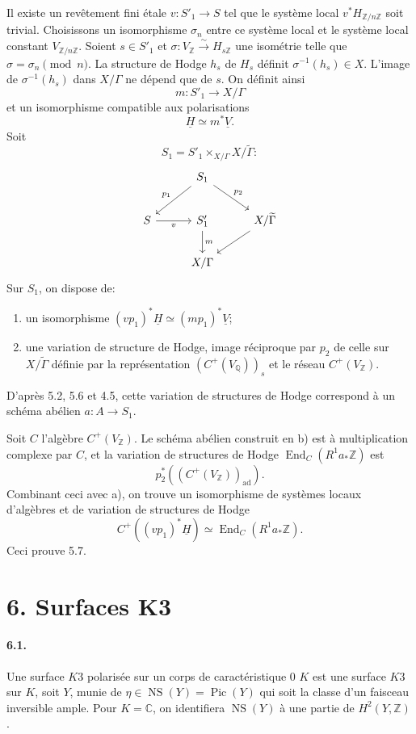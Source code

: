 \documentclass[10pt]{article}
\newcommand{\C}{\mathbb{C}}
\newcommand{\Q}{\mathbb{Q}}
\newcommand{\Z}{\mathbb{Z}}
\newcommand{\Pic}{\operatorname{Pic}}
\newcommand{\End}{\operatorname{End}}
\newcommand{\iso}{\xrightarrow{\sim}}
\providecommand{\NS}{\operatorname{NS}}
\begin{document}
Il existe un revêtement fini étale $v:S'_1\to S$ tel que le système local $v^*H_{\Z/n\Z}$ soit trivial. Choisissons un isomorphisme $\sigma_n$ entre ce système local et le système local constant $V_{\Z/n\Z}$. Soient $s\in S'_1$ et $\sigma:V_\Z\iso H_{s\Z}$ une isométrie telle que $\sigma=\sigma_n\pmod n$. La structure de Hodge $h_s$ de $H_s$ définit $\sigma^{-1}(h_s)\in X$. L'image de $\sigma^{-1}(h_s)$ dans $X/\Gamma$ ne dépend que de $s$. On définit ainsi
\[
m:S'_1\longrightarrow X/\Gamma
\]
et un isomorphisme compatible aux polarisations
\[
\underline H\simeq m^*\underline V.
\]
Soit
\[
S_1=S'_1\times_{X/\Gamma}X/\widetilde\Gamma:
\]
\[
\begin{tikzcd}[column sep=2.7em,row sep=2.0em]
& S_1 \arrow[dl,"p_1"'] \arrow[dr,"p_2"] &\\
S \arrow[r,"v"'] & S'_1 \arrow[d,"m"] & X/\widetilde\Gamma \arrow[dl]\\
& X/\Gamma &
\end{tikzcd}
\]
Sur $S_1$, on dispose de:
\begin{enumerate}[label=\alph*)]
\item un isomorphisme $(vp_1)^*\underline H\simeq (mp_1)^*\underline V$;
\item une variation de structure de Hodge, image réciproque par $p_2$ de celle sur $X/\widetilde\Gamma$ définie par la représentation $(C^+(V_\Q))_s$ et le réseau $C^+(V_\Z)$.
\end{enumerate}
D'après 5.2, 5.6 et 4.5, cette variation de structures de Hodge correspond à un schéma abélien $a:A\to S_1$.

Soit $C$ l'algèbre $C^+(V_\Z)$. Le schéma abélien construit en b) est à multiplication complexe par $C$, et la variation de structures de Hodge $\End_C(R^1a_*\Z)$ est
\[
p_2^*((C^+(V_\Z))_{\mathrm{ad}}).
\]
Combinant ceci avec a), on trouve un isomorphisme de systèmes locaux d'algèbres et de variation de structures de Hodge
\[
C^+((vp_1)^*\underline H)\simeq \End_C(R^1a_*\Z).
\]
Ceci prouve 5.7.

\section*{6. Surfaces K3}

\paragraph{6.1.} Une surface $K3$ polarisée sur un corps de caractéristique $0$ $K$ est une surface $K3$ sur $K$, soit $Y$, munie de $\eta\in\NS(Y)=\Pic(Y)$ qui soit la classe d'un faisceau inversible ample. Pour $K=\C$, on identifiera $\NS(Y)$ à une partie de $H^2(Y,\Z)$.
\end{document}
